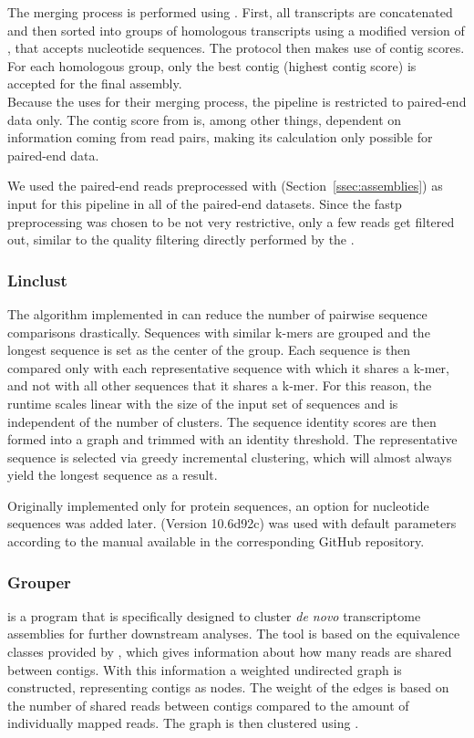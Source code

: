 \documentclass[12pt,a4paper,english]{article}
\begin{document}
	The merging process is performed using \orthofuse. First, all transcripts are concatenated and then sorted into groups of homologous transcripts using a modified version of \orthofinder \citep{OrthoFinder:15}, that accepts nucleotide sequences. The protocol then makes use of  \cite{TransRate:16} contig scores. For each homologous group, only the best contig (highest contig score) is accepted for the final assembly.\\
	Because the \orp uses \transrate for their merging process, the pipeline is restricted to paired-end data only. The contig score from \transrate is, among other things, dependent on information coming from read pairs, making its calculation only possible for paired-end data.
	
	We used the paired-end reads preprocessed with \fastp (Section~\ref{ssec:assemblies}) as input for this pipeline in all of the paired-end datasets. Since the fastp preprocessing was chosen to be not very restrictive, only a few reads get filtered out, similar to the quality filtering directly performed by the \orp.

\subsubsection*{Linclust}
	The algorithm implemented in \linclust \citep{linclust:18} can reduce the number of pairwise sequence comparisons drastically. Sequences with similar k-mers are grouped and the longest sequence is set as the center of the group. 
	Each sequence is then compared only with each representative sequence with which it shares a k-mer, and not with all other sequences that it shares a k-mer. For this reason, the runtime scales linear with the size of the input set of sequences and is independent of the number of clusters.
	The sequence identity scores are then formed into a graph and trimmed with an identity threshold. The representative sequence is selected via greedy incremental clustering, which will almost always yield the longest sequence as a result.

	Originally implemented only for protein sequences, an option for nucleotide sequences was added later. \linclust (Version 10.6d92c) was used with default parameters according to the manual available in the corresponding GitHub repository.

\subsubsection*{Grouper}
	\grouper \citep{Grouper:18} is a program that is specifically designed to cluster \textit{de novo} transcriptome assemblies for further downstream analyses. The tool is based on the equivalence classes provided by \salmon \citep{salmon:17}, which gives information about how many reads are shared between contigs. With this information a weighted undirected graph is constructed, representing contigs as nodes. The weight of the edges is based on the number of shared reads between contigs compared to the amount of individually mapped reads. The graph is then clustered using \mcl \citep{mcl:00}.
	
\end{document}
